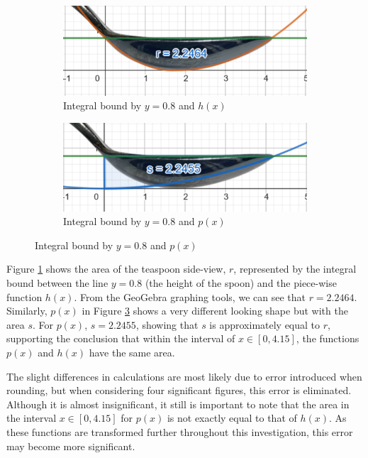 \documentclass[12pt]{article}
\begin{document}
\begin{figure}[h]
     \centering
     \begin{subfigure}[b]{0.4\textwidth}
         \centering
         \includegraphics[width=\textwidth]{more images/intbw r.png}
         \caption{Integral bound by $y=0.8$ and $h(x)$}
         \label{fig:pwabove}
     \end{subfigure}
     \hfill
     \begin{subfigure}[b]{0.4\textwidth}
         \centering
         \includegraphics[width=\textwidth]{more images/int btw s.png}
         \caption{Integral bound by $y=0.8$ and $p(x)$}
         \label{fig:pxabove}
     \end{subfigure}
     \hfill
\end{figure}

Figure \ref{fig:pwabove} shows the area of the teaspoon side-view, $r$, represented by the integral bound between the line $y=0.8$ (the height of the spoon) and the piece-wise function $h(x)$. From the GeoGebra graphing tools, we can see that $r=2.2464$. Similarly, $p(x)$ in Figure \ref{fig:pxabove} shows a very different looking shape but with the area $s$. For $p(x)$, $s=2.2455$, showing that $s$ is approximately equal to $r$, supporting the conclusion that within the interval of $x \in [0,4.15]$, the functions $p(x)$ and $h(x)$ have the same area. 

The slight differences in calculations are most likely due to error introduced when rounding, but when considering four significant figures, this error is eliminated. Although it is almost insignificant, it still is important to note that the area in the interval $x \in [0,4.15]$ for $p(x)$ is not exactly equal to that of $h(x)$. As these functions are transformed further throughout this investigation, this error may become more significant. 
\end{document}
